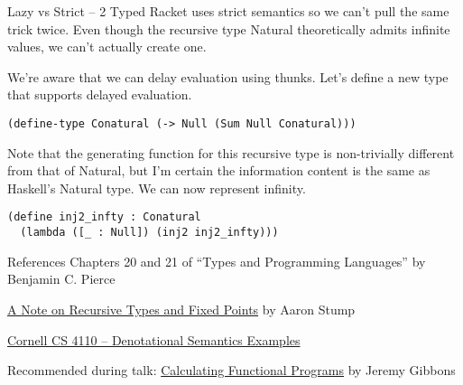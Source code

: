 \documentclass[hyperref={colorlinks = true, urlcolor = blue},pdf]{beamer}
\begin{document}
\begin{frame}[fragile]{Lazy vs Strict -- 2}
  Typed Racket uses strict semantics so we can't pull the same trick twice. Even
  though the recursive type Natural theoretically admits infinite values, we
  can't actually create one.
  \medskip

  We're aware that we can delay evaluation using thunks. Let's define a new type
  that supports delayed evaluation.
\begin{verbatim}
(define-type Conatural (-> Null (Sum Null Conatural)))
\end{verbatim}
%
Note that the generating function for this recursive type is non-trivially
different from that of Natural, but I'm certain the information content is
the same as Haskell's Natural type. We can now represent infinity.
%
\begin{verbatim}
(define inj2_infty : Conatural 
  (lambda ([_ : Null]) (inj2 inj2_infty)))
\end{verbatim}
\end{frame}
\begin{frame}{References}
  Chapters 20 and 21 of ``Types and Programming Languages'' by Benjamin C.
  Pierce
  \medskip

  \href{https://homepage.cs.uiowa.edu/~astump/notes/recursive-types-and-fixed-points.pdf}
       {A Note on Recursive Types and Fixed Points} by Aaron Stump
  \medskip

  \href{https://www.cs.cornell.edu/courses/cs4110/2018fa/lectures/lecture08.pdf}
       {Cornell CS 4110 -- Denotational Semantics Examples}
  \medskip

  Recommended during talk:
  \href{https://www.researchgate.net/publication/2615046_Calculating_Functional_Programs}
       {Calculating Functional Programs} by Jeremy Gibbons
\end{frame}
\end{document}
